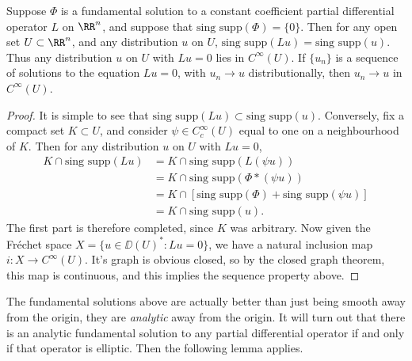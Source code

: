 \begin{lemma}
    Suppose $\Phi$ is a fundamental solution to a constant coefficient partial differential operator $L$ on $\RR^n$, and suppose that $\text{sing supp}(\Phi) = \{ 0 \}$. Then for any open set $U \subset \RR^n$, and any distribution $u$ on $U$, $\text{sing supp}(Lu) = \text{sing supp}(u)$. Thus any distribution $u$ on $U$ with $Lu = 0$ lies in $C^\infty(U)$. If $\{ u_n \}$ is a sequence of solutions to the equation $Lu = 0$, with $u_n \to u$ distributionally, then $u_n \to u$ in $C^\infty(U)$.
\end{lemma}
\begin{proof}
    It is simple to see that $\text{sing supp}(Lu) \subset \text{sing supp}(u)$. Conversely, fix a compact set $K \subset U$, and consider $\psi \in C_c^\infty(U)$ equal to one on a neighbourhood of $K$. Then for any distribution $u$ on $U$ with $Lu = 0$,
    \begin{align*}
        K \cap \text{sing supp}(Lu) &= K \cap \text{sing supp}(L(\psi u))\\
        &= K \cap \text{sing supp}(\Phi * (\psi u))\\
        &= K \cap [\text{sing supp}(\Phi) + \text{sing supp}(\psi u)]\\
        &= K \cap \text{sing supp}(u).
    \end{align*}
    The first part is therefore completed, since $K$ was arbitrary. Now given the Fr\'{e}chet space $X = \{ u \in \DD(U)^* : Lu = 0 \}$, we have a natural inclusion map $i: X \to C^\infty(U)$. It's graph is obvious closed, so by the closed graph theorem, this map is continuous, and this implies the sequence property above.
\end{proof}

The fundamental solutions above are actually better than just being smooth away from the origin, they are \emph{analytic} away from the origin. It will turn out that there is an analytic fundamental solution to any partial differential operator if and only if that operator is elliptic. Then the following lemma applies.

